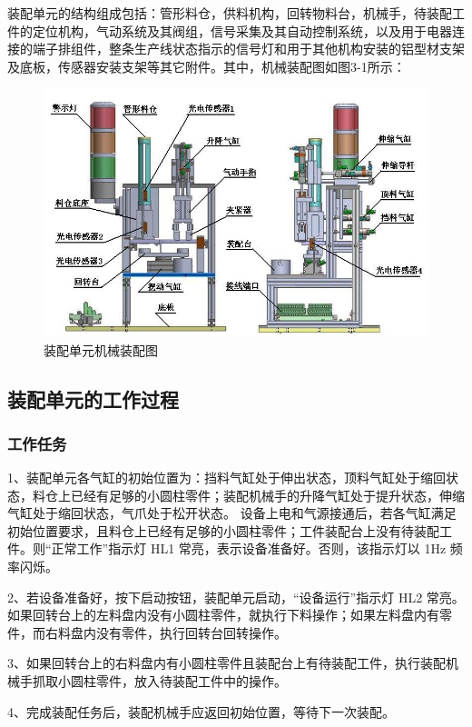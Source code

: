 \documentclass[12pt]{article}
\begin{document}
装配单元的结构组成包括：管形料仓，供料机构，回转物料台，机械手，待装配工件的定位机构，气动系统及其阀组，信号采集及其自动控制系统，以及用于电器连接的端子排组件，整条生产线状态指示的信号灯和用于其他机构安装的铝型材支架及底板，传感器安装支架等其它附件。其中，机械装配图如图3-1所示：

\begin{figure}[htbp]
    \centering
    \includegraphics[scale=0.6]{fig/2-6.jpg}
    \caption{装配单元机械装配图}
\end{figure} 

\subsection{装配单元的工作过程}
\subsubsection{工作任务}
1、装配单元各气缸的初始位置为：挡料气缸处于伸出状态，顶料气缸处于缩回状态，料仓上已经有足够的小圆柱零件；装配机械手的升降气缸处于提升状态，伸缩气缸处于缩回状态，气爪处于松开状态。 设备上电和气源接通后，若各气缸满足初始位置要求，且料仓上已经有足够的小圆柱零件；工件装配台上没有待装配工件。则“正常工作”指示灯 HL1 常亮，表示设备准备好。否则，该指示灯以 1Hz 频率闪烁。 

2、若设备准备好，按下启动按钮，装配单元启动，“设备运行”指示灯 HL2 常亮。如果回转台上的左料盘内没有小圆柱零件，就执行下料操作；如果左料盘内有零件，而右料盘内没有零件，执行回转台回转操作。

3、如果回转台上的右料盘内有小圆柱零件且装配台上有待装配工件，执行装配机械手抓取小圆柱零件，放入待装配工件中的操作。 

4、完成装配任务后，装配机械手应返回初始位置，等待下一次装配。 
\end{document}
